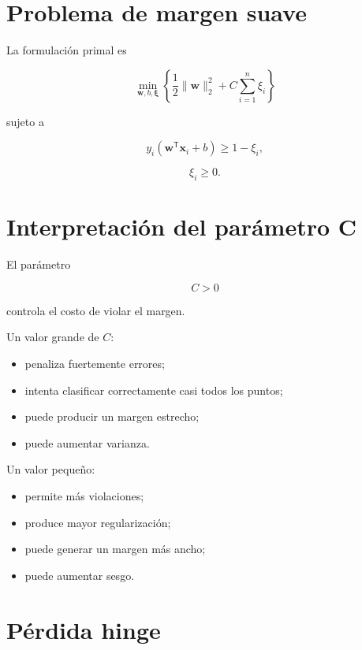 \documentclass[
  spanish,
  10.5pt,
  letterpaper,
  DIV=11,
  numbers=noendperiod,
  oneside,
  open=any]{scrreprt}
\providecommand{\tightlist}{%
  \setlength{\itemsep}{0pt}\setlength{\parskip}{0pt}}
\theoremstyle{definition}
\theoremstyle{definition}
\theoremstyle{plain}
\theoremstyle{remark}
\begin{document}
\section*{Problema de margen suave}\label{problema-de-margen-suave}


La formulación primal es

\[
\min_{\mathbf{w},b,\boldsymbol{\xi}}
\left\{
\frac{1}{2}
\|\mathbf{w}\|_2^2
+
C
\sum_{i=1}^{n}\xi_i
\right\}
\]

sujeto a

\[
y_i
\left(
\mathbf{w}^{\mathsf T}\mathbf{x}_i+b
\right)
\geq
1-\xi_i,
\]

\[
\xi_i\geq 0.
\]

\section*{Interpretación del parámetro
C}\label{interpretaciuxf3n-del-paruxe1metro-c}


El parámetro

\[
C>0
\]

controla el costo de violar el margen.

Un valor grande de \(C\):

\begin{itemize}
\tightlist
\item
  penaliza fuertemente errores;
\item
  intenta clasificar correctamente casi todos los puntos;
\item
  puede producir un margen estrecho;
\item
  puede aumentar varianza.
\end{itemize}

Un valor pequeño:

\begin{itemize}
\tightlist
\item
  permite más violaciones;
\item
  produce mayor regularización;
\item
  puede generar un margen más ancho;
\item
  puede aumentar sesgo.
\end{itemize}

\section*{Pérdida hinge}\label{puxe9rdida-hinge-2}
\end{document}
